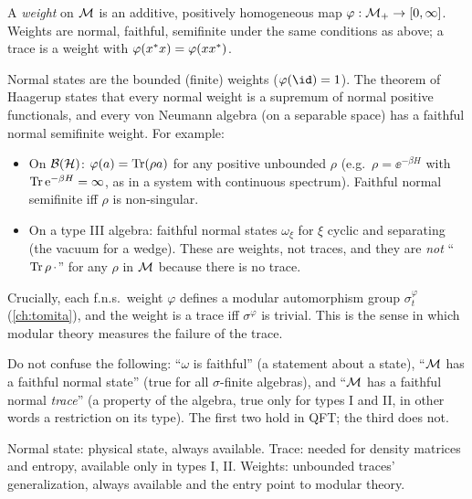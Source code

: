 \begin{definition}
A \emph{weight} on $\mathcal{M}$ is an additive, positively homogeneous map $\varphi:\mathcal{M}_+\to[0,\infty]$. Weights are normal, faithful, semifinite under the same conditions as above; a trace is a weight with $\varphi(x^{*} x)=\varphi(xx^{*})$.
\end{definition}
Normal states are the bounded (finite) weights ($\varphi(\id)=1$). The theorem of Haagerup states that every normal weight is a supremum of normal positive functionals, and every von Neumann algebra (on a separable space) has a faithful normal semifinite weight. For example:
\begin{itemize}
\item On $\mathcal{B}(\mathcal{H})$: $\varphi(a)=\operatorname{Tr}(\rho a)$ for any positive unbounded $\rho$ (e.g.\ $\rho=\ee^{-\beta H}$ with $\operatorname{Tr}\mathrm{e}^{-\beta H}=\infty$, as in a system with continuous spectrum). Faithful normal semifinite iff $\rho$ is non-singular.
\item On a type III algebra: faithful normal states $\omega_\xi$ for $\xi$ cyclic and separating (the vacuum for a wedge). These are weights, not traces, and they are \emph{not} ``$\operatorname{Tr}\rho\,\cdot$'' for any $\rho$ in $\mathcal{M}$ because there is no trace.
\end{itemize}
Crucially, each f.n.s.\ weight $\varphi$ defines a modular automorphism group $\sigma_t^\varphi$ (\cref{ch:tomita}), and the weight is a trace iff $\sigma^\varphi$ is trivial. This is the sense in which modular theory measures the failure of the trace.

\begin{whatwrong}
Do not confuse the following: ``$\omega$ is faithful'' (a statement about a state), ``$\mathcal{M}$ has a faithful normal state'' (true for all $\sigma$-finite algebras), and ``$\mathcal{M}$ has a faithful normal \emph{trace}'' (a property of the algebra, true only for types I and II, in other words a restriction on its type). The first two hold in QFT; the third does not.
\end{whatwrong}

\begin{keyidea}
Normal state: physical state, always available. Trace: needed for density matrices and entropy, available only in types I, II. Weights: unbounded traces' generalization, always available and the entry point to modular theory.
\end{keyidea}

